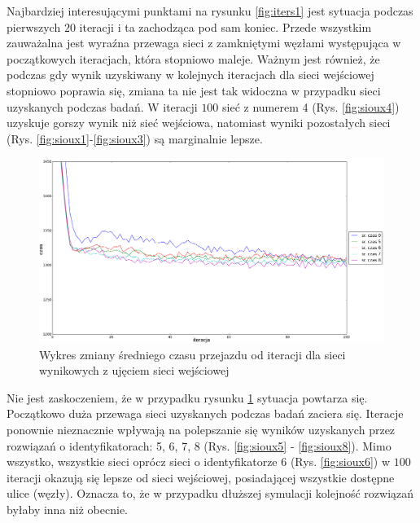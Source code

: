 \documentclass[twoside,12pt]{report}
\begin{document}
Najbardziej interesującymi punktami na rysunku \ref{fig:iters1} jest sytuacja podczas pierwszych $20$ iteracji i ta zachodząca pod sam koniec. Przede wszystkim zauważalna jest wyraźna przewaga sieci z zamkniętymi węzłami występująca w początkowych iteracjach, która stopniowo maleje. Ważnym jest również, że podczas gdy wynik uzyskiwany w kolejnych iteracjach dla sieci wejściowej stopniowo poprawia się, zmiana ta nie jest tak widoczna w przypadku sieci uzyskanych podczas badań. W iteracji $100$ sieć z numerem 4 (Rys. \ref{fig:sioux4}) uzyskuje gorszy wynik niż sieć wejściowa, natomiast wyniki pozostałych sieci (Rys. \ref{fig:sioux1}-\ref{fig:sioux3}) są marginalnie lepsze.

\begin{figure}[htbp]
\centering
\includegraphics[width=1\textwidth]{img/iters/iters2}
\caption{Wykres zmiany średniego czasu przejazdu od iteracji dla sieci wynikowych z ujęciem sieci wejściowej}
\label{fig:iters2}
\end{figure}

Nie jest zaskoczeniem, że w przypadku rysunku \ref{fig:iters2} sytuacja powtarza się. Początkowo duża przewaga sieci uzyskanych podczas badań zaciera się. Iteracje ponownie nieznacznie wpływają na polepszanie się wyników uzyskanych przez rozwiązań o identyfikatorach: 5, 6, 7, 8 (Rys. \ref{fig:sioux5} - \ref{fig:sioux8}). Mimo wszystko, wszystkie sieci oprócz sieci o identyfikatorze 6 (Rys. \ref{fig:sioux6}) w $100$ iteracji okazują się lepsze od sieci wejściowej, posiadającej wszystkie dostępne ulice (węzły). Oznacza to, że w przypadku dłuższej symulacji kolejność rozwiązań byłaby inna niż obecnie.
\end{document}
